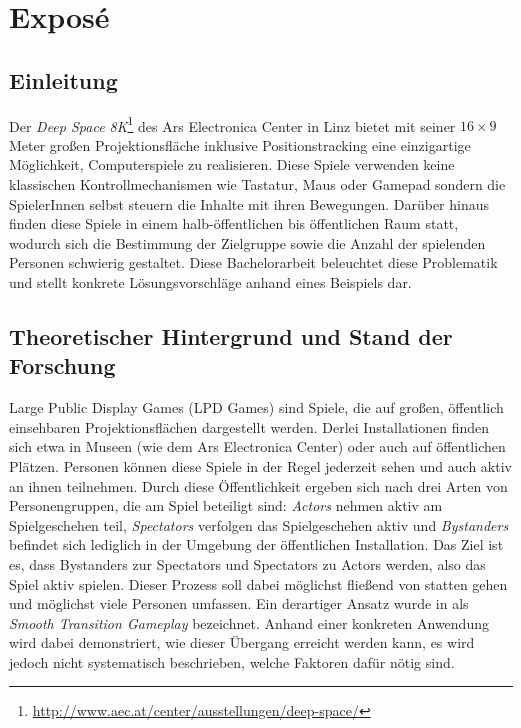 \chapter{Exposé}

\section{Einleitung}

Der \emph{Deep Space 8K}\footnote{\url{http://www.aec.at/center/ausstellungen/deep-space/}} des Ars Electronica Center in Linz bietet mit seiner $16 \times 9$ Meter großen Projektionsfläche inklusive Positionstracking eine einzigartige Möglichkeit, Computerspiele zu realisieren. Diese Spiele verwenden keine klassischen Kontrollmechanismen wie Tastatur, Maus oder Gamepad sondern die SpielerInnen selbst steuern die Inhalte mit ihren Bewegungen. Darüber hinaus finden diese Spiele in einem halb-öffentlichen bis öffentlichen Raum statt, wodurch sich die Bestimmung der Zielgruppe sowie die Anzahl der spielenden Personen schwierig gestaltet. Diese Bachelorarbeit beleuchtet diese Problematik und stellt konkrete Lösungsvorschläge anhand eines Beispiels dar.

\section{Theoretischer Hintergrund und Stand der Forschung}
\label{sec:hintergrund}

Large Public Display Games (LPD Games) sind Spiele, die auf großen, öffentlich einsehbaren Projektionsflächen dargestellt werden. Derlei Installationen finden sich etwa in Museen (wie dem Ars Electronica Center) oder auch auf öffentlichen Plätzen. Personen können diese Spiele in der Regel jederzeit sehen und auch aktiv an ihnen teilnehmen. Durch diese Öffentlichkeit ergeben sich nach \cite{Finke2008} drei Arten von Personengruppen, die am Spiel beteiligt sind: \emph{Actors} nehmen aktiv am Spielgeschehen teil, \emph{Spectators} verfolgen das Spielgeschehen aktiv und \emph{Bystanders} befindet sich lediglich in der Umgebung der öffentlichen Installation. Das Ziel ist es, dass Bystanders zur Spectators und Spectators zu Actors werden, also das Spiel aktiv spielen. Dieser Prozess soll dabei möglichst fließend von statten gehen und möglichst viele Personen umfassen. Ein derartiger Ansatz wurde in \cite{Hochleitner2013} als \emph{Smooth Transition Gameplay} bezeichnet. Anhand einer konkreten Anwendung wird dabei demonstriert, wie dieser Übergang erreicht werden kann, es wird jedoch nicht systematisch beschrieben, welche Faktoren dafür nötig sind.

